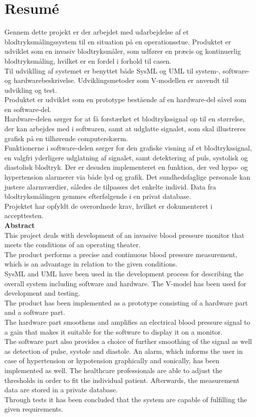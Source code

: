 \chapter{Resumé}
Gennem dette projekt er der arbejdet med udarbejdelse af et blodtryksmålingssystem til en situation på en operationsstue. Produktet er udviklet som en invasiv blodtryksmåler, som udfører en præcis og kontinuerlig blodtryksmåling, hvilket er en fordel i forhold til casen. \\
Til udviklling af systemet er benyttet både SysML og UML til system-, software- og hardwarebeskrivelse. Udviklingsmetoder som V-modellen er anvendt til udvikling og test.\\ 
Produktet er udviklet som en prototype bestående af en hardware-del såvel som en software-del.\\[0.5ex]
Hardware-delen sørger for at få forstærket et blodtrykssignal op til en størrelse, der kan arbejdes med i softwaren, samt at udglatte signalet, som skal illustreres grafisk på en tilhørende computerskærm.\\[1ex]
Funktionerne i software-delen sørger for den grafiske visning af et blodtrykssignal, en valgfri yderligere udglatning af signalet, samt detektering af puls, systolisk og diastolisk blodtryk. Der er desuden implementeret en funktion, der ved hypo- og hypertension alarmerer via både lyd og grafik. Det sundhedsfaglige personale kan justere alarmværdier, således de tilpasses det enkelte individ. Data fra blodtryksmålingen gemmes efterfølgende i en privat database.\\[0.5ex]
Projektet har opfyldt de overordnede krav, hvilket er dokumenteret i accepttesten. \\[2ex]
\textbf{Abstract}\\
This project deals with development of an invasive blood pressure monitor that meets the conditions of an operating theater.\\
The product performs a precise and continuous blood pressure measurement, which is an advantage in relation to the given conditions.\\
SysML and UML have been used in the development process for describing the overall system including software and hardware. The V-model has been used for development and testing.\\
The product has been implemented as a prototype consisting of a hardware part and a software part.\\
The hardware part smoothens and amplifies an electrical blood pressure signal to a gain that makes it suitable for the software to display it on a monitor.\\
The software part also provides a choice of further smoothing of the signal as well as detection of pulse, systole and diastole. An alarm, which informs the user in case of hypertension or hypotension graphically and sonically, has been implemented as well. The healthcare professionals are able to adjust the thresholds in order to fit the individual patient. Afterwards, the measurement data are stored in a private database.\\
Through tests it has been concluded that the system are capable of fulfilling the given requirements.
